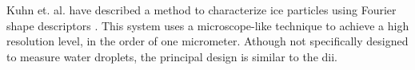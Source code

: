 Kuhn et. al. \cite{kuhn2012} have described a method to characterize ice particles using Fourier shape descriptors \cite{gran1972,walla1980}. This system uses a microscope-like technique to achieve a high resolution level, in the order of one micrometer. Athough not specifically designed to measure water droplets, the principal design is similar to the \gls{dii}. 
%
%

